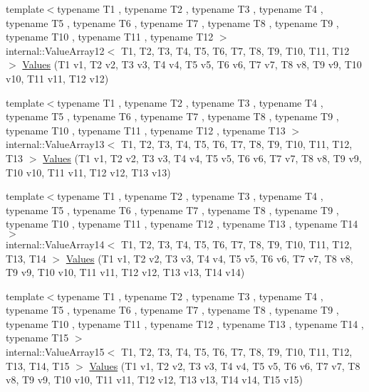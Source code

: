 \begin{DoxyCompactItemize}
\item 
{\footnotesize template$<$typename T1 , typename T2 , typename T3 , typename T4 , typename T5 , typename T6 , typename T7 , typename T8 , typename T9 , typename T10 , typename T11 , typename T12 $>$ }\\internal\-::\-Value\-Array12$<$ \-T1, \-T2, \*
\-T3, \-T4, \-T5, \-T6, \-T7, \-T8, \-T9, \*
\-T10, \-T11, \-T12 $>$ \hyperlink{namespacetesting_a03e7f9611794732bb030c53365dc6c86}{\-Values} (\-T1 v1, \-T2 v2, \-T3 v3, \-T4 v4, \-T5 v5, \-T6 v6, \-T7 v7, \-T8 v8, \-T9 v9, \-T10 v10, \-T11 v11, \-T12 v12)
\item 
{\footnotesize template$<$typename T1 , typename T2 , typename T3 , typename T4 , typename T5 , typename T6 , typename T7 , typename T8 , typename T9 , typename T10 , typename T11 , typename T12 , typename T13 $>$ }\\internal\-::\-Value\-Array13$<$ \-T1, \-T2, \*
\-T3, \-T4, \-T5, \-T6, \-T7, \-T8, \-T9, \*
\-T10, \-T11, \-T12, \-T13 $>$ \hyperlink{namespacetesting_aa13a09e043383c947042ba726d25d47c}{\-Values} (\-T1 v1, \-T2 v2, \-T3 v3, \-T4 v4, \-T5 v5, \-T6 v6, \-T7 v7, \-T8 v8, \-T9 v9, \-T10 v10, \-T11 v11, \-T12 v12, \-T13 v13)
\item 
{\footnotesize template$<$typename T1 , typename T2 , typename T3 , typename T4 , typename T5 , typename T6 , typename T7 , typename T8 , typename T9 , typename T10 , typename T11 , typename T12 , typename T13 , typename T14 $>$ }\\internal\-::\-Value\-Array14$<$ \-T1, \-T2, \*
\-T3, \-T4, \-T5, \-T6, \-T7, \-T8, \-T9, \*
\-T10, \-T11, \-T12, \-T13, \-T14 $>$ \hyperlink{namespacetesting_a2d00ed785e0e796e6f36dc79c051dc76}{\-Values} (\-T1 v1, \-T2 v2, \-T3 v3, \-T4 v4, \-T5 v5, \-T6 v6, \-T7 v7, \-T8 v8, \-T9 v9, \-T10 v10, \-T11 v11, \-T12 v12, \-T13 v13, \-T14 v14)
\item 
{\footnotesize template$<$typename T1 , typename T2 , typename T3 , typename T4 , typename T5 , typename T6 , typename T7 , typename T8 , typename T9 , typename T10 , typename T11 , typename T12 , typename T13 , typename T14 , typename T15 $>$ }\\internal\-::\-Value\-Array15$<$ \-T1, \-T2, \*
\-T3, \-T4, \-T5, \-T6, \-T7, \-T8, \-T9, \*
\-T10, \-T11, \-T12, \-T13, \-T14, \-T15 $>$ \hyperlink{namespacetesting_ab0c1943e4f680df0d92c695ed0ac36df}{\-Values} (\-T1 v1, \-T2 v2, \-T3 v3, \-T4 v4, \-T5 v5, \-T6 v6, \-T7 v7, \-T8 v8, \-T9 v9, \-T10 v10, \-T11 v11, \-T12 v12, \-T13 v13, \-T14 v14, \-T15 v15)
\item 

\end{DoxyCompactItemize}
